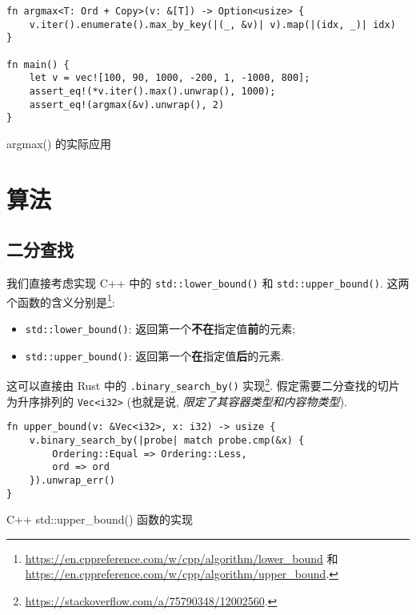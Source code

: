 \documentclass{crbook}
\begin{document}
\begin{listing}
    \linespread{1}
    \begin{verbatim}
fn argmax<T: Ord + Copy>(v: &[T]) -> Option<usize> {
    v.iter().enumerate().max_by_key(|(_, &v)| v).map(|(idx, _)| idx)
}

fn main() {
    let v = vec![100, 90, 1000, -200, 1, -1000, 800];
    assert_eq!(*v.iter().max().unwrap(), 1000);
    assert_eq!(argmax(&v).unwrap(), 2)
}
    \end{verbatim}
    \caption{argmax() 的实际应用}
\end{listing}

\newpage
\section{算法}
\subsection{二分查找}

我们直接考虑实现 C++ 中的 \texttt{std::lower\_bound()} 和 \texttt{std::upper\_bound()}. 这两个函数的含义分别是\footnote{\url{https://en.cppreference.com/w/cpp/algorithm/lower\_bound} 和 \url{https://en.cppreference.com/w/cpp/algorithm/upper\_bound}.}:

\begin{itemize}
    \item \texttt{std::lower\_bound()}: 返回第一个\textbf{不在}指定值\textbf{前}的元素;
    \item \texttt{std::upper\_bound()}: 返回第一个\textbf{在}指定值\textbf{后}的元素.
\end{itemize}

这可以直接由 Rust 中的 \texttt{.binary\_search\_by()} 实现\footnote{\url{https://stackoverflow.com/a/75790348/12002560}.}. 假定需要二分查找的切片为升序排列的 \texttt{Vec<i32>} (也就是说, \textit{限定了其容器类型和内容物类型}).

\begin{listing}
    \linespread{1}
    \begin{verbatim}
fn upper_bound(v: &Vec<i32>, x: i32) -> usize {
    v.binary_search_by(|probe| match probe.cmp(&x) {
        Ordering::Equal => Ordering::Less,
        ord => ord
    }).unwrap_err()
}
    \end{verbatim}
    \caption{C++ std::upper\_bound() 函数的实现}
\end{listing}
\end{document}

